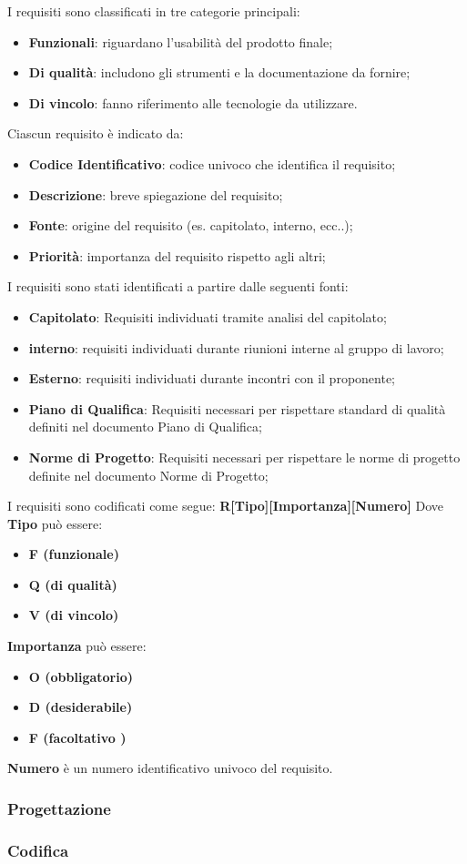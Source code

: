 
I requisiti sono classificati in tre categorie principali:  
\begin{itemize}
    \item \textbf{Funzionali}: riguardano l'usabilità del prodotto finale;  
    \item \textbf{Di qualità}: includono gli strumenti e la documentazione da fornire;  
    \item \textbf{Di vincolo}: fanno riferimento alle tecnologie da utilizzare.
\end{itemize}
Ciascun requisito è indicato da:
\begin{itemize}
    \item \textbf{Codice Identificativo}: codice univoco che identifica il requisito;
    \item \textbf{Descrizione}: breve spiegazione del requisito;
    \item \textbf{Fonte}: origine del requisito (es. capitolato, interno, ecc..);
    \item \textbf{Priorità}: importanza del requisito rispetto agli altri;
\end{itemize} 

I requisiti sono stati identificati a partire dalle seguenti fonti:
\begin{itemize}
    \item \textbf{Capitolato}: Requisiti individuati tramite analisi del capitolato;
    \item \textbf{interno}: requisiti individuati durante riunioni interne al gruppo di lavoro;
    \item \textbf{Esterno}: requisiti individuati durante incontri con il proponente;
    \item \textbf{Piano di Qualifica}: Requisiti necessari per rispettare standard di qualità definiti nel documento Piano di Qualifica;
    \item \textbf{Norme di Progetto}: Requisiti necessari per rispettare le norme di progetto definite nel documento Norme di Progetto;
\end{itemize}

I requisiti sono codificati come segue: \textbf{R[Tipo][Importanza][Numero]}
\newline
Dove \textbf{Tipo} può essere:
\begin{itemize}
    \item \textbf{F (funzionale)}
    \item \textbf{Q (di qualità)}
    \item \textbf{V (di vincolo)}
\end{itemize}
\textbf{Importanza} può essere:
\begin{itemize}
    \item \textbf{O (obbligatorio)}
    \item \textbf{D (desiderabile)}
    \item \textbf{F (facoltativo )}
\end{itemize}
\textbf{Numero} è un numero identificativo univoco del requisito.


\subsubsection{Progettazione}
\subsubsection{Codifica}
